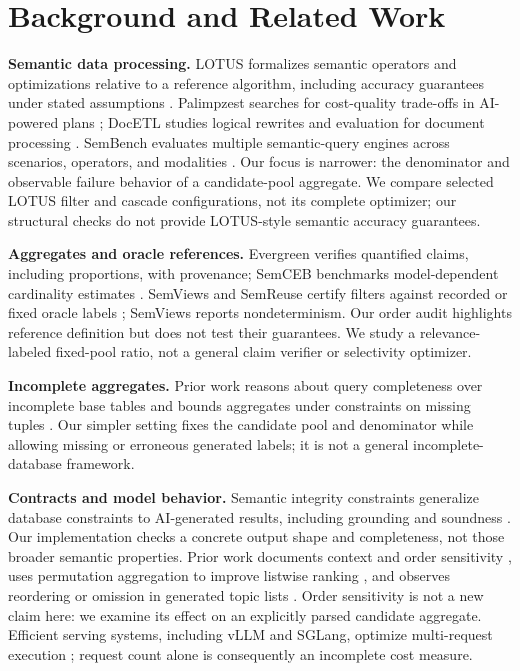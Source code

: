 \documentclass[conference]{IEEEtran}
\begin{document}
\section{Background and Related Work}
\textbf{Semantic data processing.} LOTUS formalizes semantic operators and optimizations relative to a reference algorithm, including accuracy guarantees under stated assumptions \cite{lotus}. Palimpzest searches for cost-quality trade-offs in AI-powered plans \cite{palimpzest}; DocETL studies logical rewrites and evaluation for document processing \cite{docetl}. SemBench evaluates multiple semantic-query engines across scenarios, operators, and modalities \cite{sembench}. Our focus is narrower: the denominator and observable failure behavior of a candidate-pool aggregate. We compare selected LOTUS filter and cascade configurations, not its complete optimizer; our structural checks do not provide LOTUS-style semantic accuracy guarantees.

\textbf{Aggregates and oracle references.} Evergreen verifies quantified claims, including proportions, with provenance; SemCEB benchmarks model-dependent cardinality estimates \cite{evergreen,semceb}. SemViews and SemReuse certify filters against recorded or fixed oracle labels \cite{semviews,semreuse}; SemViews reports nondeterminism. Our order audit highlights reference definition but does not test their guarantees. We study a relevance-labeled fixed-pool ratio, not a general claim verifier or selectivity optimizer.

\textbf{Incomplete aggregates.} Prior work reasons about query completeness over incomplete base tables \cite{query_completeness} and bounds aggregates under constraints on missing tuples \cite{contingency}. Our simpler setting fixes the candidate pool and denominator while allowing missing or erroneous generated labels; it is not a general incomplete-database framework.

\textbf{Contracts and model behavior.} Semantic integrity constraints generalize database constraints to AI-generated results, including grounding and soundness \cite{constraints}. Our implementation checks a concrete output shape and completeness, not those broader semantic properties. Prior work documents context and order sensitivity \cite{lostmiddle}, uses permutation aggregation to improve listwise ranking \cite{permcons}, and observes reordering or omission in generated topic lists \cite{outputorder}. Order sensitivity is not a new claim here: we examine its effect on an explicitly parsed candidate aggregate. Efficient serving systems, including vLLM and SGLang, optimize multi-request execution \cite{vllm,sglang}; request count alone is consequently an incomplete cost measure.
\end{document}
